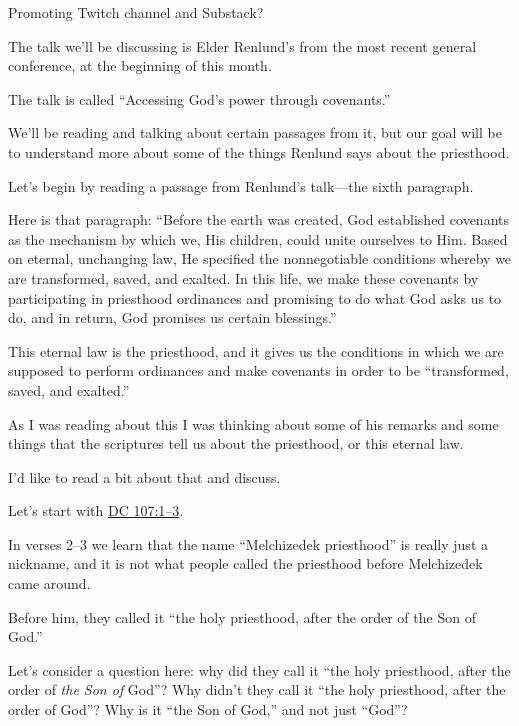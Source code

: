 		\begin{compactitem}
			\item Promoting Twitch channel and Substack?
			\item The talk we'll be discussing is Elder Renlund's from the most recent general conference, at the beginning of this month.
				\begin{compactitem}
					\item The talk is called ``Accessing God's power through covenants.''
					\item We'll be reading and talking about certain passages from it, but our goal will be to understand more about some of the things Renlund says about the priesthood.
				\end{compactitem}
			\item Let's begin by reading a passage from Renlund's talk---the sixth paragraph.
				\begin{compactitem}
					\item Here is that paragraph: ``Before the earth was created, God established covenants as the mechanism by which we, His children, could unite ourselves to Him. Based on eternal, unchanging law, He specified the nonnegotiable conditions whereby we are transformed, saved, and exalted. In this life, we make these covenants by participating in priesthood ordinances and promising to do what God asks us to do, and in return, God promises us certain blessings.''
					\item This eternal law is the priesthood, and it gives us the conditions in which we are supposed to perform ordinances and make covenants in order to be ``transformed, saved, and exalted.''
					\item As I was reading about this I was thinking about some of his remarks and some things that the scriptures tell us about the priesthood, or this eternal law.
					\item I'd like to read a bit about that and discuss.
					\item Let's start with \hyperref[DC107-1]{DC 107:1--3}.
					\item In verses 2--3 we learn that the name ``Melchizedek priesthood'' is really just a nickname, and it is not what people called the priesthood before Melchizedek came around.
					\item Before him, they called it ``the holy priesthood, after the order of the Son of God.''
					\item Let's consider a question here: why did they call it ``the holy priesthood, after the order of \textit{the Son of} God''? Why didn't they call it ``the holy priesthood, after the order of God''? Why is it ``the Son of God,'' and not just ``God''?

\end{compactitem}
\end{compactitem}
